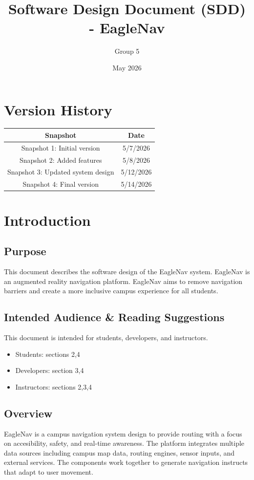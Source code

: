 \documentclass{article}
\title{Software Design Document (SDD) - EagleNav}
\author{Group 5}
\date{May 2026}
\begin{document}
\maketitle
\clearpage

\tableofcontents
\newpage

\section{Version History}
\begin{table}[h!]
	\centering
	\begin{tabular}{|c|c|}
		\hline
		\textbf{Snapshot} & \textbf{Date} \\
		\hline
		Snapshot 1: Initial version & 5/7/2026 \\
		Snapshot 2: Added features & 5/8/2026 \\
		Snapshot 3: Updated system design & 5/12/2026 \\
		Snapshot 4: Final version & 5/14/2026 \\
		\hline
	\end{tabular}
\end{table}


\section{Introduction}
\subsection{Purpose}
This document describes the software design of the EagleNav system.
EagleNav is an augmented reality navigation platform. EagleNav aims to remove navigation barriers and create a more inclusive campus experience for all students.


\subsection{Intended Audience \& Reading Suggestions}
This document is intended for students, developers, and instructors.
\begin{itemize}
	\item Students: sections 2,4 
	\item Developers: section 3,4 
	\item Instructors: sections 2,3,4
\end{itemize}

\subsection{Overview}
EagleNav is a campus navigation system design to provide routing with a focus on accesibility, 
safety, and real-time awareness. The platform integrates multiple data sources including campus map data, routing engines, sensor inputs, and external services. 
The components work together to generate navigation instructs that adapt to user movement.
\end{document}
